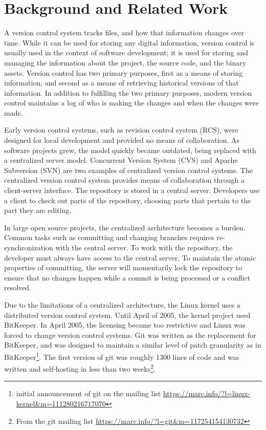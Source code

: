 \chapter{Background and Related Work}\label{chap:background}

A version control system tracks files, and how that information changes over time.
While it can be used for storing any digital information,
version control is usually used in the context of software development;
it is used for storing and managing the information about
the project, the source code, and the binary assets.
Version control has two primary purposes,
first as a means of storing information,
and second as a means of retrieving historical versions of that information.
In addition to fulfilling the two primary purposes, modern version
control maintains a log of who is making the changes and when the
changes were made.

Early version control systems, such as revision control system (RCS),
were designed for local development and provided no means of collaboration.
As software projects grew, the model quickly became outdated,
being replaced with a centralized server model.
Concurrent Version System (CVS) and Apache Subversion (SVN) are two
examples of centralized version control systems. The centralized version
control system provides means of collaboration through a client-server
interface. The repository is stored in a central server. Developers use
a client to check out parts of the repository, choosing parts that
pertain to the part they are editing.

In large open source projects, the centralized architecture becomes a
burden. Common tasks such as committing and changing branches requires
re-synchronization with the central server.
To work with the repository,
the developer must always have access to the central server.
To maintain the atomic properties of committing, the server will
momentarily lock the repository to ensure that no changes happen while a
commit is being processed or a conflict resolved.

Due to the limitations of a centralized architecture, the Linux kernel
uses a distributed version control system. Until April of 2005, the
kernel project used BitKeeper.
In April 2005, the licensing became too restrictive and Linux was forced
to change version control systems.
Git was written as the replacement for BitKeeper, and was designed to
maintain a similar level of patch granularity as in BitKeeper\footnote{
  initial announcement of git on the mailing list
  \url{https://marc.info/?l=linux-kernel&m=111280216717070}}. The first
version of git was roughly 1300 lines of code and was written and
self-hosting in less than two weeks\footnote{From the git mailing list
  \url{https://marc.info/?l=git&m=117254154130732}}.

